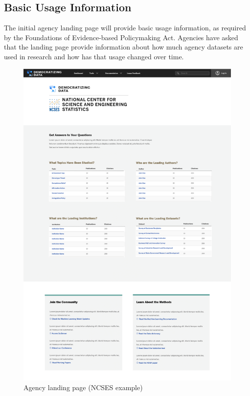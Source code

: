 \documentclass[titlepage, 11pt]{article}
\begin{document}
{\subsection{Basic Usage Information}

The initial agency landing page will provide basic usage information, as required by the Foundations of Evidence-based Policymaking Act.  Agencies have asked that the landing page provide information about how much agency datasets are used in research and how has that usage changed over time.  

\begin{figure}
\centering
  \includegraphics[scale=0.25]{agency_landing_page.png}
  \caption{Agency landing page (NCSES example)}
  \label{fig:agency_landing_page}
\end{figure}

}
\end{document}
